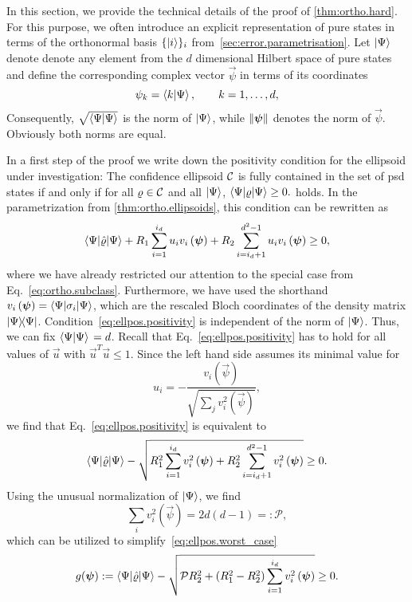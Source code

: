 In this section, we provide the technical details of the proof of \cref{thm:ortho.hard}.
For this purpose, we often introduce an explicit representation of pure states in terms of the orthonormal basis $\{\ket{i}\}_i$ from~\cref{sec:error.parametrisation}.
Let $\ket{\Psi}$ denote denote any element from the $d$ dimensional Hilbert space of pure states and define the corresponding  complex vector $\vec{\psi}$ in terms of its coordinates
\[
  \psi_{k} = \braket{k | \Psi} ,\qquad k=1,\ldots,d,\label{coordinates}
\]
Consequently, $\sqrt{\braket{\Psi | \Psi}}$ is the norm of $\ket{\Psi}$, while ${\Vert{\boldsymbol{\psi}}\Vert}$ denotes the norm of $\vec\psi$.
Obviously both norms are equal.

In a first step of the proof we write down the positivity condition for the ellipsoid under investigation:
The confidence ellipsoid $\mathcal{C}$ is fully contained in the set of psd states if and only if for all $\varrho \in \mathcal{C}$ and all $\ket{\Psi}$,
\(
  \bra{\Psi} \varrho \ket{\Psi} \ge 0.
\)
holds.
In the parametrization from \cref{thm:ortho.ellipsoids}, this condition can be rewritten as
\[
  \bra{\Psi}\estim{\varrho} \ket{\Psi} +R_{1}\sum_{i=1}^{i_{d}}u_{i}v_{i}\left(\vec\psi\right)+R_{2}\sum_{i=i_{d}+1}^{d^{2}-1}u_{i}v_{i}\left(\vec\psi\right)\geq0,
  \label{eq:ellpos.positivity}
\]
where we have already restricted our attention to the special case from Eq.~\eqref{eq:ortho.subclass}.
Furthermore, we have used the shorthand $v_{i}\left(\vec\psi\right)=\bra{\Psi}\sigma_{i} \ket{\Psi} $, which are the rescaled Bloch coordinates of the density matrix $\ket{\Psi} \bra{\Psi}$.
Condition~\eqref{eq:ellpos.positivity} is independent of the norm of $\ket{\Psi}$.
Thus, we can fix $\left\langle \Psi \ket{\Psi} \right. = d$.
Recall that Eq.~\eqref{eq:ellpos.positivity} has to hold for all values of $\vec u$ with $\vec u^T \vec u \le 1$.
Since the left hand side assumes its minimal value for
\[
  u_{i} = -\frac{v_{i}\left(\vec\psi\right)}{\sqrt{\sum_{j}v_{i}^{2}\left(\vec\psi\right)}},
\]
we find that Eq.~\eqref{eq:ellpos.positivity} is equivalent to
\[
 \bra{\Psi}\estim{\varrho} \ket{\Psi} -\sqrt{R_{1}^{2}\sum_{i=1}^{i_{d}}v_{i}^{2}\left(\vec\psi\right)+R_{2}^{2}\sum_{i=i_{d}+1}^{d^{2}-1}v_{i}^{2}\left(\vec\psi\right)}\geq0.
  \label{eq:ellpos.worst_case}
\]
Using the unusual normalization of $\ket\Psi$, we find
\[
  \sum_{i}v_{i}^{2}\left(\vec\psi\right)=2 d\left(d-1\right) =: \mathcal{P},
\]
which can be utilized to simplify~\eqref{eq:ellpos.worst_case}
\[
 g(\vec\psi) := \bra{\Psi}\estim{\varrho} \ket{\Psi} -\sqrt{\mathcal{P}R_{2}^{2}+\left(R_{1}^{2}-R_{2}^{2}\right)\sum_{i=1}^{i_{d}}v_{i}^{2}\left(\vec\psi\right)}\geq0.
  \label{eq:ellpos.major}
\]

